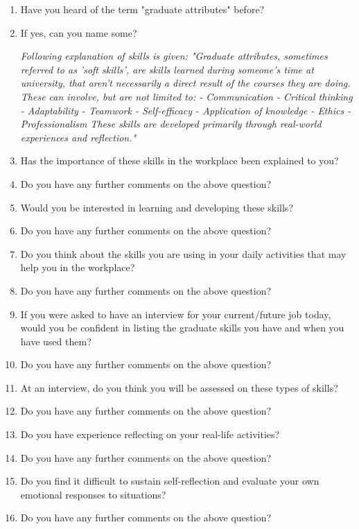 \documentclass{l4proj}
\begin{document}
\begin{appendices}
\begin{enumerate}
    \item Have you heard of the term "graduate attributes" before?
    \item If yes, can you name some?

    \textit{Following explanation of skills is given: "Graduate attributes, sometimes referred to as 'soft skills', are skills learned during someone's time at university, that aren't necessarily a direct result of the courses they are doing. These can involve, but are not limited to:
    - Communication
    - Critical thinking
    - Adaptability
    - Teamwork
    - Self-efficacy
    - Application of knowledge
    - Ethics
    - Professionalism 
    These skills are developed primarily through real-world experiences and reflection."}
    \item Has the importance of these skills in the workplace been explained to you?
    \item Do you have any further comments on the above question?
    \item Would you be interested in learning and developing these skills? 
    \item Do you have any further comments on the above question?
    \item Do you think about the skills you are using in your daily activities that may help you in the workplace? 
    \item Do you have any further comments on the above question?
    \item If you were asked to have an interview for your current/future job today, would you be confident in listing the graduate skills you have and when you have used them?
    \item Do you have any further comments on the above question? 
    \item At an interview, do you think you will be assessed on these types of skills?
    \item Do you have any further comments on the above question? 
    \item Do you have experience reflecting on your real-life activities? 
    \item Do you have any further comments on the above question?
    \item Do you find it difficult to sustain self-reflection and evaluate your own emotional responses to situations? 
    \item Do you have any further comments on the above question?
\end{enumerate}


\end{appendices}
\end{document}
